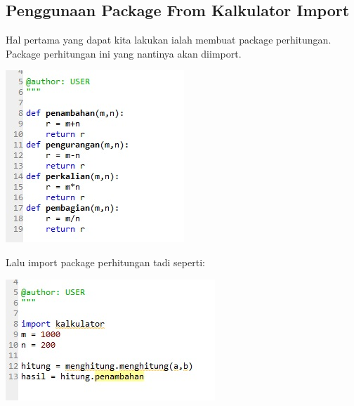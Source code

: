 \documentclass[a4paper,12pt]{report}
\begin{document}
\subsection{Penggunaan Package From Kalkulator Import}
\par Hal pertama yang dapat kita lakukan ialah membuat package perhitungan. Package perhitungan ini yang nantinya akan diimport.
    \begin{center}
    \includegraphics[width=11cm\textwidth]{Figure/kalkulator.jpg}
    \end{center}
\par Lalu import package perhitungan tadi seperti:
    \begin{center}
    \includegraphics[width=11cm\textwidth]{Figure/kalkulatorim.jpg}
    \end{center}
    
\end{document}
